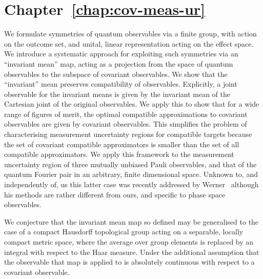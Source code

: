 \section*{Chapter~\ref{chap:cov-meas-ur}}

We formulate symmetries of quantum observables via a finite group, with action on the outcome set, and unital, linear representation acting on the effect space. We introduce a systematic approach for exploiting such symmetries via an ``invariant mean'' map, acting as a projection from the space of quantum observables to the subspace of covariant observables. We show that the ``invariant'' mean preserves compatibility of observables. Explicitly, a joint observable for the invariant means is given by the invariant mean of the Cartesian joint of the original observables. We apply this to show that for a wide range of figures of merit, the optimal compatible approximations to covariant observables are given by covariant observables. This simplifies the problem of characterising measurement uncertainty regions for compatible targets because the set of covariant compatible approximators is smaller than the set of all compatible approximators. We apply this framework to the measurement uncertainty region of three mutually unbiased Pauli observables, and that of the quantum Fourier pair in an arbitrary, finite dimensional space. Unknown to, and independently of, us this latter case was recently addressed by Werner~\cite{Werner2016} although his methods are rather different from ours, and specific to phase space observables.

We conjecture that the invariant mean map so defined may be generalised to the case of a compact Hausdorff topological group acting on a separable, locally compact metric space, where the average over group elements is replaced by an integral with respect to the Haar measure. Under the additional assumption that the observable that map is applied to is absolutely continuous with respect to a covariant observable.
